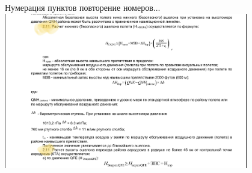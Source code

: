 \documentclass[utf8]{beamer}
\begin{document}
\begin{frame}{Нумерация пунктов}    
    повторение номеров...
    \includegraphics[width=0.8\textwidth]{Numeric2.png}            
\end{frame}
\end{document}

